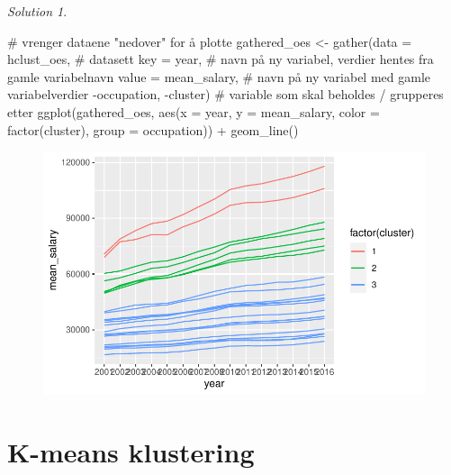 \documentclass[
  letterpaper,
  DIV=11,
  numbers=noendperiod]{scrreprt}
\newenvironment{Shaded}{\begin{snugshade}}{\end{snugshade}}
\newcommand{\AttributeTok}[1]{\textcolor[rgb]{0.40,0.45,0.13}{#1}}
\newcommand{\CommentTok}[1]{\textcolor[rgb]{0.37,0.37,0.37}{#1}}
\newcommand{\FunctionTok}[1]{\textcolor[rgb]{0.28,0.35,0.67}{#1}}
\newcommand{\NormalTok}[1]{\textcolor[rgb]{0.00,0.23,0.31}{#1}}
\newcommand{\OtherTok}[1]{\textcolor[rgb]{0.00,0.23,0.31}{#1}}
\newcommand{\SpecialCharTok}[1]{\textcolor[rgb]{0.37,0.37,0.37}{#1}}
\theoremstyle{definition}
\theoremstyle{remark}
\newtheorem*{solution}{Solution}
\begin{document}
\begin{solution}
\begin{Shaded}
\begin{Highlighting}[]
\CommentTok{\# vrenger dataene "nedover" for å plotte}
\NormalTok{gathered\_oes }\OtherTok{\textless{}{-}} \FunctionTok{gather}\NormalTok{(}\AttributeTok{data =}\NormalTok{ hclust\_oes,    }\CommentTok{\# datasett}
                       \AttributeTok{key =}\NormalTok{ year,           }\CommentTok{\# navn på ny variabel, verdier hentes fra gamle variabelnavn}
                       \AttributeTok{value =}\NormalTok{ mean\_salary,  }\CommentTok{\# navn på ny variabel med gamle variabelverdier}
                       \SpecialCharTok{{-}}\NormalTok{occupation, }\SpecialCharTok{{-}}\NormalTok{cluster) }\CommentTok{\# variable som skal beholdes / grupperes etter}
\FunctionTok{ggplot}\NormalTok{(gathered\_oes, }\FunctionTok{aes}\NormalTok{(}\AttributeTok{x =}\NormalTok{ year, }\AttributeTok{y =}\NormalTok{ mean\_salary, }\AttributeTok{color =} \FunctionTok{factor}\NormalTok{(cluster), }\AttributeTok{group =}\NormalTok{ occupation)) }\SpecialCharTok{+} 
  \FunctionTok{geom\_line}\NormalTok{()}
\end{Highlighting}
\end{Shaded}

\begin{figure}[H]

{\centering \includegraphics{./unsupervised_files/figure-pdf/unnamed-chunk-2-3.pdf}

}

\end{figure}

\end{solution}

\hypertarget{k-means-klustering}{%
\section{K-means klustering}\label{k-means-klustering}}
\end{document}
